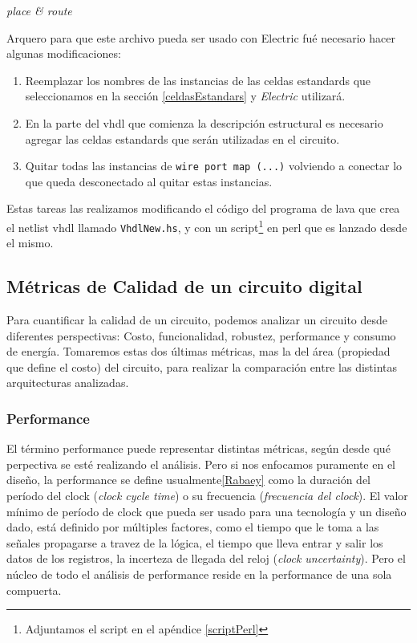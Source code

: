 \emph{place \& route}



Arquero para que este archivo pueda ser usado con Electric fué necesario hacer algunas modificaciones:
\begin{enumerate}
\item Reemplazar los nombres de las instancias de las celdas estandards que  seleccionamos en la sección \ref{celdasEstandars} y \emph{Electric} utilizará.
\item En la parte del vhdl que comienza la descripción estructural es necesario agregar las celdas estandards que serán utilizadas en el circuito.
\item Quitar todas las instancias de \verb|wire port map (...)| volviendo a conectar lo que queda desconectado al quitar estas instancias.
\end{enumerate}  
Estas tareas las realizamos modificando el código del programa de lava que crea el netlist vhdl llamado \verb|VhdlNew.hs|, y con un script\footnote{Adjuntamos el script en el apéndice \ref{scriptPerl}} en perl que es lanzado desde el mismo.
\subsection{Métricas de Calidad de un circuito digital}

Para cuantificar la calidad de un circuito, podemos analizar un circuito desde diferentes perspectivas: Costo, funcionalidad, robustez, performance y consumo de energía. Tomaremos estas dos últimas métricas, mas la del área (propiedad que define el costo) del circuito, para realizar la comparación entre las distintas arquitecturas analizadas.

\subsubsection{Performance}
El término performance puede representar distintas métricas, según desde qué perpectiva se esté realizando el análisis. Pero si nos enfocamos puramente en el diseño, la performance se define usualmente\ref{Rabaey} como la duración del período del clock (\emph{clock cycle time}) o su frecuencia (\emph{frecuencia del clock}). El valor mínimo de período de clock que pueda ser usado para una tecnología y un diseño dado, está definido por múltiples factores, como el tiempo que le toma a las señales propagarse a travez de la lógica, el tiempo que lleva entrar y salir los datos de los registros, la incerteza de llegada del reloj (\emph{clock uncertainty}). Pero el núcleo de todo el análisis de performance reside en la performance de una sola compuerta.


